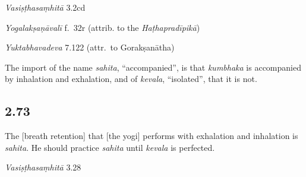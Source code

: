 \begin{ekdosis}
\begin{sources}[hp02_072]
\emph{Vasiṣṭhasaṃhitā} 3.2cd

\begin{versinnote}
\end{versinnote}
\end{sources}

\begin{testimonia}[hp02_072]
\emph{Yogalakṣaṇāvalī} f.~32r (attrib. to the \emph{Haṭhapradīpikā})
\begin{versinnote}
\end{versinnote}

\emph{Yuktabhavadeva} 7.122 (attr.~to Gorakṣanātha)

\begin{versinnote}
\end{versinnote}
\end{testimonia}

\begin{philcomm}[hp02_072]
The import of the name \emph{sahita}, “accompanied”, is that \emph{kumbhaka} is accompanied by inhalation and exhalation, and of \emph{kevala}, “isolated”, that it is not.
\end{philcomm}

\subsection*{2.73}
\begin{translation}[hp02_073]
The [breath retention] that [the yogi] performs with exhalation and inhalation is \emph{sahita}. He should practice \emph{sahita} until \emph{kevala} is perfected.
\end{translation}


\begin{sources}[hp02_073]
\emph{Vasiṣṭhasaṃhitā} 3.28


\end{sources}
\end{ekdosis}
